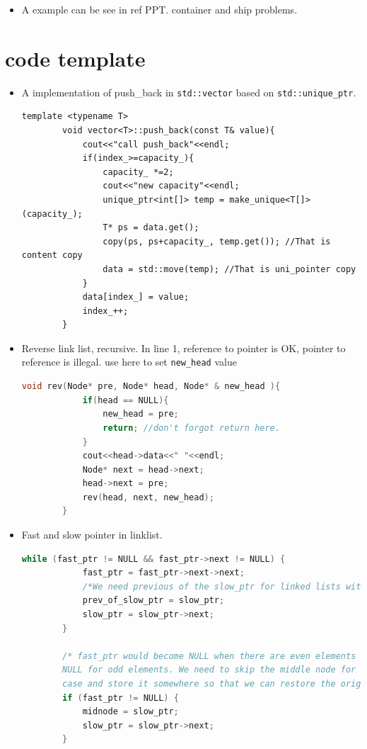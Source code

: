 \documentclass[a4paper,11pt,twoside]{book}
\begin{document}
\begin{itemize}
\item A example can be see in ref PPT.  container and ship problems. 

\end{itemize}

\section{code template}

\begin{itemize}
	
		\item A implementation of push\_back in \texttt{std::vector} based on \texttt{std::unique\_ptr}. 
	
	\begin{lstlisting}[numbers=none]
		template <typename T>
		void vector<T>::push_back(const T& value){
			cout<<"call push_back"<<endl;
			if(index_>=capacity_){
				capacity_ *=2;
				cout<<"new capacity"<<endl;
				unique_ptr<int[]> temp = make_unique<T[]>(capacity_);
				T* ps = data.get();
				copy(ps, ps+capacity_, temp.get()); //That is content copy
				data = std::move(temp); //That is uni_pointer copy
			}
			data[index_] = value;
			index_++;
		}		
	\end{lstlisting}
	
		\item Reverse link list, recursive. In line 1, reference to pointer is OK, pointer to reference is illegal. use here to set \texttt{new\_head} value
	\begin{lstlisting}[frame=single, language=c++]	
		void rev(Node* pre, Node* head, Node* & new_head ){ 
			if(head == NULL){
				new_head = pre;
				return; //don't forgot return here. 
			}
			cout<<head->data<<" "<<endl;
			Node* next = head->next;
			head->next = pre;
			rev(head, next, new_head);
		}	
	\end{lstlisting}
	
	
		\item Fast and slow pointer in linklist.	
	\begin{lstlisting}[frame=single, language=c++]	
		while (fast_ptr != NULL && fast_ptr->next != NULL) {
			fast_ptr = fast_ptr->next->next;	
			/*We need previous of the slow_ptr for linked lists with odd elements */
			prev_of_slow_ptr = slow_ptr;
			slow_ptr = slow_ptr->next;
		}
		
		/* fast_ptr would become NULL when there are even elements in list.And not 
		NULL for odd elements. We need to skip the middle node for odd 
		case and store it somewhere so that we can restore the original list*/
		if (fast_ptr != NULL) {
			midnode = slow_ptr;
			slow_ptr = slow_ptr->next;
		}		
	\end{lstlisting}
	

\end{itemize}
\end{document}
